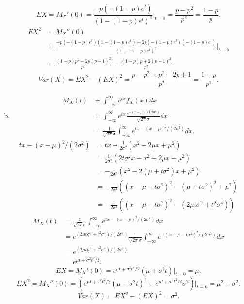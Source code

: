 \documentclass[14pt]{elegantbook}
\begin{document}
\begin{solution}
\begin{enumerate}[(a)]
            \[EX=M_X'(0)=\frac{-p(-(1-p)e^t)}{(1-(1-p)e^t)^2}|_{t=0}=\frac{p-p^2}{p^2}=\frac{1-p}{p}. \]
            \begin{align*}
                EX^2&=M_X''(0)\\
                &=\frac{-p(-(1-p)e^t)(1-(1-p)e^t)+2p(-(1-p)e^t)(-(1-p)e^t)}{(1-(1-p)e^t)^3}|_{t=0}\\
                &=\frac{(1-p)p^2+2p(p-1)^2}{p^3}=\frac{(1-p)p+2(p-1)^2}{p^2}. 
            \end{align*}
            \[Var(X)=EX^2-(EX)^2=\frac{p-p^2+p^2-2p+1}{p^2}=\frac{1-p}{p^2}. \]
            \item \begin{align*}
                M_X(t)&=\int_{-\infty}^\infty e^{tx}f_X(x) dx\\
                &=\int_{-\infty}^\infty e^{tx}\frac{e^{-(x-\mu)^2/(2\sigma^2)}}{\sqrt{2\pi}\sigma}dx\\
                &=\frac{1}{\sqrt{2\pi}\sigma}\int_{-\infty}^\infty e^{tx-(x-\mu)^2/(2\sigma^2)}dx. 
            \end{align*}
            \begin{align*}
                tx-(x-\mu)^2/(2\sigma^2)&=tx-\frac{1}{2\sigma^2}(x^2-2\mu x+\mu^2)\\
                &=\frac{1}{2\sigma^2}(2t\sigma^2x-x^2+2\mu x-\mu^2)\\
                &=-\frac{1}{2\sigma^2}(x^2-2(\mu+t\sigma^2)x+\mu^2)\\
                &=-\frac{1}{2\sigma^2}((x-\mu-t\sigma^2)^2-(\mu+t\sigma^2)^2+\mu^2)\\
                &=-\frac{1}{2\sigma^2}((x-\mu-t\sigma^2)^2-(2\mu t\sigma^2+t^2\sigma^4))
            \end{align*}
            \begin{align*}
                M_X(t)&=\frac{1}{\sqrt{2\pi}\sigma}\int_{-\infty}^\infty e^{tx-(x-\mu)^2/(2\sigma^2)}dx\\&=e^{(2\mu t\sigma^2+t^2\sigma^4)/(2\sigma^2)}\frac{1}{\sqrt{2\pi}\sigma}\int_{-\infty}^\infty e^{-(x-\mu-t\sigma^2)^2/(2\sigma^2)}dx\\
                &=e^{(2\mu t\sigma^2+t^2\sigma^4)/(2\sigma^2)}\\
                &=e^{\mu t+\sigma^2t^2/2}.
            \end{align*}
            \[EX=M_X'(0)=e^{\mu t+\sigma^2t^2/2}(\mu+\sigma^2t)|_{t=0}=\mu. \]
            \[EX^2=M_X''(0)=\left(e^{\mu t+\sigma^2t^2/2}(\mu+\sigma^2t)^2+e^{\mu t+\sigma^2t^2/2}\sigma^2\right)|_{t=0}=\mu^2+\sigma^2. \]
            \[Var(X)=EX^2-(EX)^2=\sigma^2. \]
        \end{enumerate}
    \end{solution}
\end{document}
